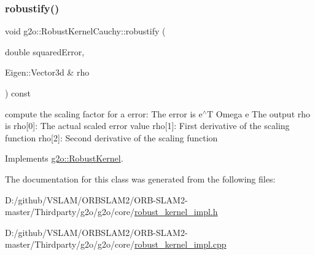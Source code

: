 \subsubsection{\texorpdfstring{robustify()}{robustify()}}
{\footnotesize\ttfamily void g2o\+::\+Robust\+Kernel\+Cauchy\+::robustify (\begin{DoxyParamCaption}\item[{double}]{squared\+Error,  }\item[{Eigen\+::\+Vector3d \&}]{rho }\end{DoxyParamCaption}) const\hspace{0.3cm}{\ttfamily [virtual]}}

compute the scaling factor for a error\+: The error is e$^\wedge$T Omega e The output rho is rho\mbox{[}0\mbox{]}\+: The actual scaled error value rho\mbox{[}1\mbox{]}\+: First derivative of the scaling function rho\mbox{[}2\mbox{]}\+: Second derivative of the scaling function 

Implements \mbox{\hyperlink{classg2o_1_1_robust_kernel_ab47b071a0cfe466be063f0104bc41d0f}{g2o\+::\+Robust\+Kernel}}.



The documentation for this class was generated from the following files\+:\begin{DoxyCompactItemize}
\item 
D\+:/github/\+V\+S\+L\+A\+M/\+O\+R\+B\+S\+L\+A\+M2/\+O\+R\+B-\/\+S\+L\+A\+M2-\/master/\+Thirdparty/g2o/g2o/core/\mbox{\hyperlink{robust__kernel__impl_8h}{robust\+\_\+kernel\+\_\+impl.\+h}}\item 
D\+:/github/\+V\+S\+L\+A\+M/\+O\+R\+B\+S\+L\+A\+M2/\+O\+R\+B-\/\+S\+L\+A\+M2-\/master/\+Thirdparty/g2o/g2o/core/\mbox{\hyperlink{robust__kernel__impl_8cpp}{robust\+\_\+kernel\+\_\+impl.\+cpp}}\end{DoxyCompactItemize}
